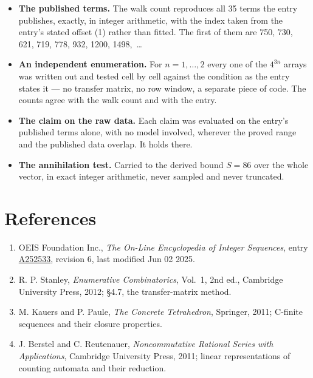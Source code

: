 \documentclass[11pt]{article}
\theoremstyle{definition}
\begin{document}
\begin{itemize}

\item {\bfseries The published terms.} The walk count reproduces all 35 terms the entry publishes, exactly, in integer arithmetic, with the index taken from the entry's stated offset (1) rather than fitted. The first of them are 750, 730, 621, 719, 778, 932, 1200, 1498,~\dots

\item {\bfseries An independent enumeration.} For $n = 1,\dots,2$ every one of the $4^{3n}$ arrays was written out and tested cell by cell against the condition as the entry states it --- no transfer matrix, no row window, a separate piece of code. The counts agree with the walk count and with the entry.

\item {\bfseries The claim on the raw data.} Each claim was evaluated on the entry's published terms alone, with no model involved, wherever the proved range and the published data overlap. It holds there.

\item {\bfseries The annihilation test.} Carried to the derived bound $S = 86$ over the whole vector, in exact integer arithmetic, never sampled and never truncated.

\end{itemize}

\section{References}

\begin{enumerate}

\item OEIS Foundation Inc., \emph{The On-Line Encyclopedia of Integer Sequences}, entry \href{https://oeis.org/A252533}{A252533}, revision 6, last modified Jun 02 2025.

\item R. P. Stanley, \emph{Enumerative Combinatorics}, Vol.~1, 2nd ed., Cambridge University Press, 2012; \S4.7, the transfer-matrix method.

\item M. Kauers and P. Paule, \emph{The Concrete Tetrahedron}, Springer, 2011; C-finite sequences and their closure properties.

\item J. Berstel and C. Reutenauer, \emph{Noncommutative Rational Series with Applications}, Cambridge University Press, 2011; linear representations of counting automata and their reduction.

\end{enumerate}
\end{document}
